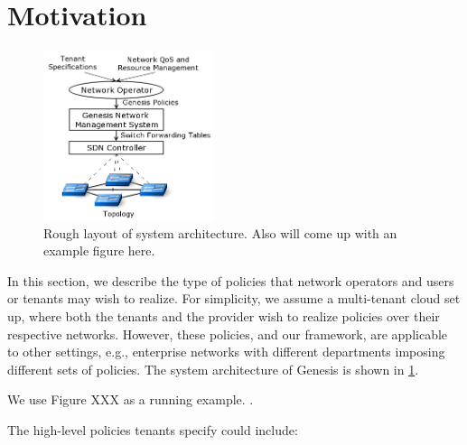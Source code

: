 \section{Motivation}
\begin{figure}[H]
	\includegraphics[height=5cm]{figures/architecture.png}
	\caption{Rough layout of system architecture. Also will come up with an example figure here.}
	\label{fig:architecture}
\end{figure}
In this section, we describe the type of
policies that network operators and users or tenants may wish to
realize. For simplicity, we assume a multi-tenant cloud set up, where
both the tenants and the provider wish to realize policies over their
respective networks. However, these policies, and our framework, are
applicable to other settings, e.g., enterprise networks with different
departments imposing different sets of policies. The system architecture of 
Genesis is shown in \cref{fig:architecture}.

We use Figure XXX as a running example. .



The high-level policies tenants specify could include:

